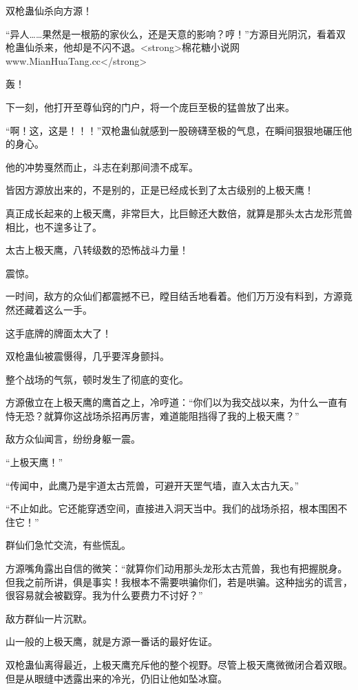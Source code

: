 
\begin{this_body}

双枪蛊仙杀向方源！

“异人……果然是一根筋的家伙么，还是天意的影响？哼！”方源目光阴沉，看着双枪蛊仙杀来，他却是不闪不退。<strong>棉花糖小说网www.MianHuaTang.cc</strong>

轰！

下一刻，他打开至尊仙窍的门户，将一个庞巨至极的猛兽放了出来。

“啊！这，这是！！！”双枪蛊仙就感到一股磅礴至极的气息，在瞬间狠狠地碾压他的身心。

他的冲势戛然而止，斗志在刹那间溃不成军。

皆因方源放出来的，不是别的，正是已经成长到了太古级别的上极天鹰！

真正成长起来的上极天鹰，非常巨大，比巨鲸还大数倍，就算是那头太古龙形荒兽相比，也不遑多让了。

太古上极天鹰，八转级数的恐怖战斗力量！

震惊。

一时间，敌方的众仙们都震撼不已，瞠目结舌地看着。他们万万没有料到，方源竟然还藏着这么一手。

这手底牌的牌面太大了！

双枪蛊仙被震慑得，几乎要浑身颤抖。

整个战场的气氛，顿时发生了彻底的变化。

方源傲立在上极天鹰的鹰首之上，冷哼道：“你们以为我交战以来，为什么一直有恃无恐？就算你这战场杀招再厉害，难道能阻挡得了我的上极天鹰？”

敌方众仙闻言，纷纷身躯一震。

“上极天鹰！”

“传闻中，此鹰乃是宇道太古荒兽，可避开天罡气墙，直入太古九天。”

“不止如此。它还能穿透空间，直接进入洞天当中。我们的战场杀招，根本围困不住它！”

群仙们急忙交流，有些慌乱。

方源嘴角露出自信的微笑：“就算你们动用那头龙形太古荒兽，我也有把握脱身。但我之前所讲，俱是事实！我根本不需要哄骗你们，若是哄骗。这种拙劣的谎言，很容易就会被戳穿。我为什么要费力不讨好？”

敌方群仙一片沉默。

山一般的上极天鹰，就是方源一番话的最好佐证。

双枪蛊仙离得最近，上极天鹰充斥他的整个视野。尽管上极天鹰微微闭合着双眼。但是从眼缝中透露出来的冷光，仍旧让他如坠冰窟。


\end{this_body}
